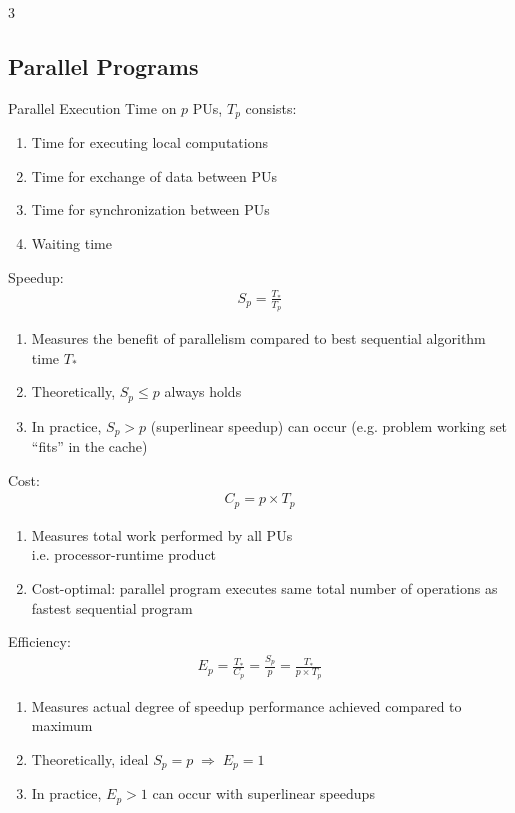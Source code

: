 \documentclass[12pt, a4paper]{article}
\begin{document}
\begin{multicols*}{3}
\colbreak
\subsection{Parallel Programs}
Parallel Execution Time on $p$ PUs, $T_p$ consists:
\begin{enumerate}[\roman*.]
  \item Time for executing local computations
  \item Time for exchange of data between PUs
  \item Time for synchronization between PUs
  \item Waiting time
\end{enumerate}\vspace{1em}

Speedup:
\begin{gather*}
  S_p = \frac{T_{*}}{T_p}
\end{gather*}
\begin{enumerate}[\roman*.]
  \item Measures the benefit of parallelism compared to best sequential algorithm time $T_*$ 
  \item Theoretically, $S_p \le p$ always holds
  \item In practice, $S_p > p$ (superlinear speedup) can occur (e.g. problem working set ``fits'' in the cache)
\end{enumerate}\vspace{1em}

Cost:
\begin{gather*}
  C_p = p \times T_p
\end{gather*}
\begin{enumerate}[\roman*.]
  \item Measures total work performed by all PUs\\ 
    i.e. processor-runtime product
\item Cost-optimal: parallel program executes same total number of operations as fastest sequential program
\end{enumerate}\vspace{1em}

Efficiency:
\begin{gather*}
  E_p = \frac{T_{*}}{C_p} = \frac{S_p}{p} = \frac{T_{*}}{p \times T_p}
\end{gather*}
\begin{enumerate}[\roman*.]
  \item Measures actual degree of speedup performance achieved compared to maximum
  \item Theoretically, ideal $S_p=p \;\Rightarrow\; E_p=1$
  \item In practice, $E_p > 1$ can occur with superlinear speedups
\end{enumerate}\vspace{1em}


\end{multicols*}
\end{document}
